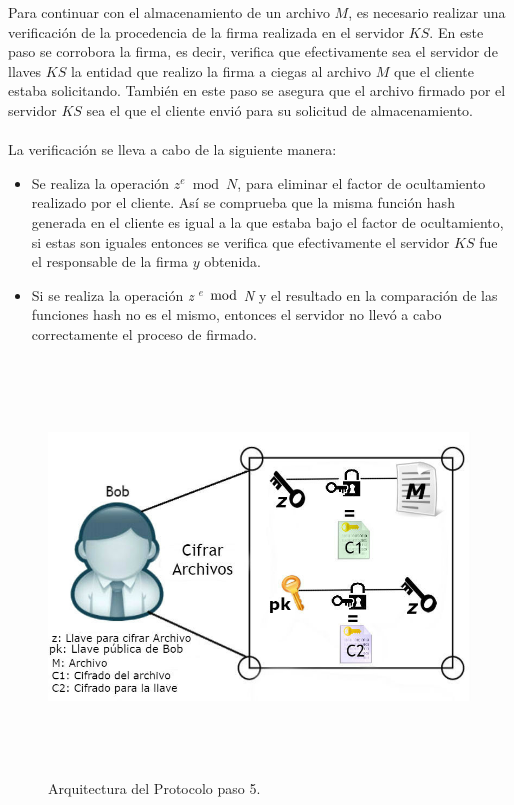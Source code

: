 Para continuar con el almacenamiento de un archivo $M$, es necesario realizar una verificación de la procedencia de la firma realizada en el servidor $KS$. En este paso se corrobora la firma, es decir, verifica que efectivamente sea el servidor de llaves $KS$ la entidad que realizo la firma a ciegas al archivo $M$ que el cliente estaba solicitando. También en este paso se asegura que el archivo firmado por el servidor $KS$ sea el que el cliente envió para su solicitud de almacenamiento. \\ \\
La verificación se lleva a cabo de la siguiente manera: 
\begin{itemize}
\item Se realiza la operación $z^e \bmod N $, para eliminar el factor de ocultamiento realizado por el cliente. Así se comprueba que la misma función hash generada en el cliente es igual a la que estaba bajo el factor de ocultamiento, si estas son iguales entonces se verifica que efectivamente el servidor $KS$ fue el responsable de la firma $y$ obtenida. 
\item Si se realiza la operación \textit{z $^e$ $\bmod$ N} y el resultado en la comparación de las funciones hash no es el mismo, entonces el servidor no llevó a cabo correctamente el proceso de firmado.

\end{itemize}


\begin{figure}[H]
\centering
\includegraphics[width=16cm, height=11cm]{./images/Paso04.jpg}
\caption{Arquitectura del Protocolo paso 5.}

\end{figure}

